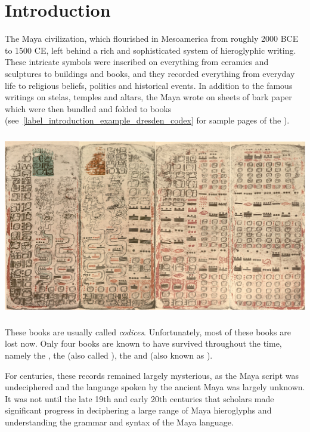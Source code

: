 \documentclass[../main.tex]{subfiles}
\begin{document}
\chapter{Introduction}
The Maya civilization, which flourished in Mesoamerica from roughly 2000 BCE to 1500 CE, 
left behind a rich and sophisticated system of hieroglyphic writing. 
These intricate symbols were inscribed on everything from ceramics and sculptures to buildings 
and books, and they recorded everything from everyday life to religious beliefs, politics and 
historical events.
In addition to the famous writings on stelas, temples and altars, the Maya wrote on sheets of 
bark paper which were then bundled and 
folded to books (see~\ref{label_introduction_example_dresden_codex} for sample pages of the
\dresdencodex).
\begin{center}
    \includegraphics[height=8cm,keepaspectratio]{img/example-dresden-codex}
    \label{label_introduction_example_dresden_codex}
\end{center}
These books are usually called \emph{codices}.
Unfortunately, most of these books are lost now.
Only four books are known to have survived throughout the time, 
namely the \dresdencodex, the \madridcodex (also called \troanocodex),
the \pariscodex and \mayamexicocodex(also known as \groliercodex).

For centuries, these records remained largely mysterious, as the Maya script was 
undeciphered and the language spoken by the ancient Maya was largely unknown.
It was not until the late 19th and early 20th centuries that scholars made significant progress 
in deciphering a large range of Maya hieroglyphs and understanding the grammar and syntax of 
the Maya language. 
\end{document}
